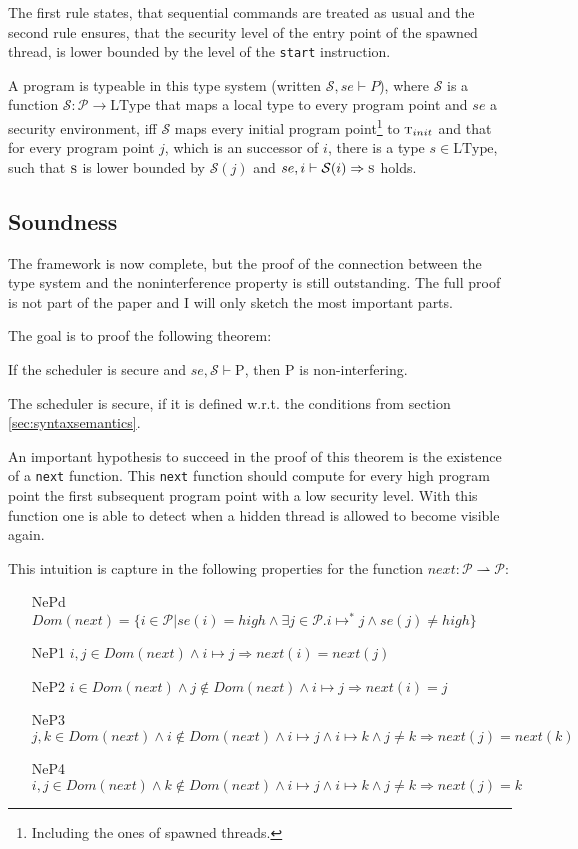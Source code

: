 \documentclass[a4paper,10pt]{llncs}
\begin{document}
The first rule states, that sequential commands are treated as usual
and the second rule ensures, that the security level of the entry point
of the spawned thread, is lower bounded by the level of the \texttt{start}
instruction.

A program is typeable in this type system (written $\mathcal{S}, se \vdash P$),
where $\mathcal{S}$ is a function $\mathcal{S}: \mathcal{P} \rightarrow \text{LType}$
that maps a local type to every program point
and $se$ a security environment, iff $\mathcal{S}$ maps every initial program point\footnote{
Including the ones of spawned threads.} to $\textsc{t}_{init}$ and that for every program point $j$, which is an
successor of $i$, there is a type $s \in \text{LType}$, such that $\textsc{s}$ is lower bounded
by $\mathcal{S}(j)$ and $se, i \vdash \mathcal{S}(i) \Rightarrow \textsc{s}$ holds.

\subsection{Soundness}
\label{sec:soundness}
The framework is now complete, but the proof of the connection between the
type system and the noninterference property is still outstanding. The full
proof is not part of the paper and I will only sketch the most important
parts.

The goal is to proof the following theorem:

\begin{theorem}
If the scheduler is secure and $se, \mathcal{S} \vdash \text{P}$, then $\text{P}$ is non-interfering.
\end{theorem}

The scheduler is secure, if it is defined w.r.t. the conditions from section \ref{sec:syntaxsemantics}.

An important hypothesis to succeed in the proof of this theorem is the existence
of a \texttt{next} function. This \texttt{next} function should compute for every
high program point the first subsequent program point with a low security level. With
this function one is able to detect when a hidden thread is allowed to become visible
again.

This intuition is capture in the following properties for the function $next: \mathcal{P}
\rightharpoonup \mathcal{P}$:

{\small
\begin{enumerate}
\item[NePd] $Dom(next) = \{i \in \mathcal{P} | se(i) = high \land \exists j \in \mathcal{P} . i \mapsto^* j \land se(j) \neq high\}$
\item[NeP1] $i, j \in Dom(next) \land i \mapsto j \Rightarrow next(i) = next(j)$
\item[NeP2] $i \in Dom(next) \land j \not\in Dom(next) \land i \mapsto j \Rightarrow next(i) = j$
\item[NeP3] $j, k \in Dom(next) \land i \not\in Dom(next) \land i \mapsto j \land i \mapsto k \land j \neq k \Rightarrow next(j) = next(k)$
\item[NeP4] $i, j \in Dom(next) \land k \not\in Dom(next) \land i \mapsto j \land i \mapsto k \land j \neq k \Rightarrow next(j) = k$
\end{enumerate}
}
\end{document}
